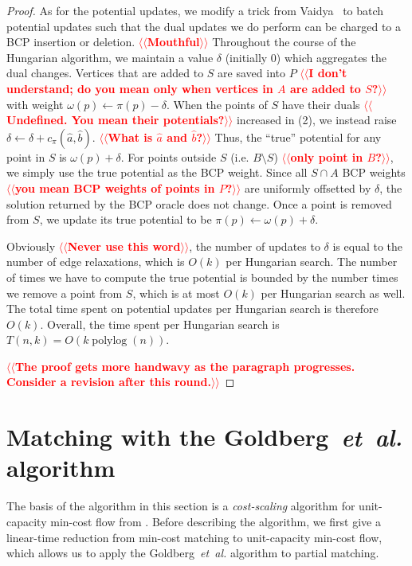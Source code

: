 \documentclass[11pt]{article}
\makeatletter
\def\etal{\textsl{et~al.}}
\def\polylog{\mathop{\mathrm{polylog}}}
\theoremstyle{plain}
\def\n@te#1{\textsf{\boldmath \textbf{$\langle\!\langle$#1$\rangle\!\rangle$}}\leavevmode}
\def\note#1{\textcolor{red}{\n@te{#1}}}
\makeatother
\begin{document}
\begin{proof}
As for the potential updates,
we modify a trick from Vaidya~\cite{Vaidya89} to batch potential
updates such that the dual updates we do perform can be charged to a
BCP insertion or deletion. \note{Mouthful}
Throughout the course of the Hungarian algorithm, we maintain a value
$\delta$ (initially 0) which aggregates the dual changes.
Vertices that are added to $S$ are saved into $P$ \note{I don't understand; do you mean only when vertices in $A$ are added to $S$?} with weight
$\omega(p) \gets \pi(p) - \delta$.
When the points of $S$ have their duals \note{Undefined. You mean their potentials?} increased in (2), we instead
raise $\delta \gets \delta + c_\pi(\hat{a}, \hat{b})$. \note{What is $\hat{a}$ and $\hat{b}$?}
Thus, the ``true'' potential for any point in $S$ is
$\omega(p) + \delta$.
For points outside $S$ (i.e. $B \setminus S$) \note{only point in $B$?}, we simply use the true
potential as the BCP weight.
Since all $S \cap A$ BCP weights \note{you mean BCP weights of points in $P$?} are uniformly offsetted by $\delta$, the solution returned by the BCP oracle does not change.
Once a point is removed from $S$, we update its true potential
to be $\pi(p) \gets \omega(p) + \delta$.

Obviously \note{Never use this word}, the number of updates to $\delta$ is equal to the number of
edge relaxations, which is $O(k)$ per Hungarian search.
The number of times we have to compute the true potential is bounded by
the number times we remove a point from $S$, which is at most $O(k)$ per Hungarian search as well.
The total time spent on potential updates per Hungarian search is therefore
$O(k)$.
Overall, the time spent per Hungarian search is $T(n, k) = O(k\polylog(n))$.

\note{The proof gets more handwavy as the paragraph progresses.  Consider a revision after this round.}
\end{proof}


\section{Matching with the Goldberg~{\etal} algorithm}
\label{section:goldberg}

The basis of the algorithm in this section is a \emph{cost-scaling} algorithm
for unit-capacity min-cost flow from \cite{GHKT17}.
Before describing the algorithm, we first give a linear-time reduction from
min-cost matching to unit-capacity min-cost flow, which allows us to apply the
Goldberg~{\etal} algorithm to partial matching.
\end{document}
